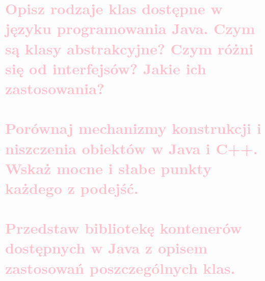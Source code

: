 \section{\textcolor{pink}{Opisz rodzaje klas dostępne w języku programowania Java. Czym są klasy abstrakcyjne? Czym różni się od interfejsów? Jakie ich zastosowania?}}

\section{\textcolor{pink}{Porównaj mechanizmy konstrukcji i niszczenia obiektów w Java i C++. Wskaż mocne i słabe punkty każdego z podejść.}}

\section{\textcolor{pink}{Przedstaw bibliotekę kontenerów dostępnych w Java z opisem zastosowań poszczególnych klas.}}